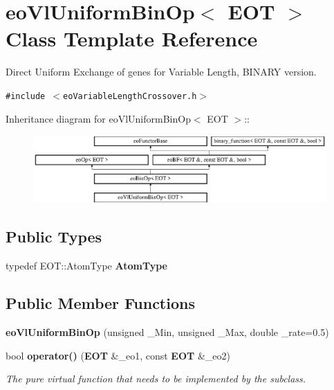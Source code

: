 \section{eo\-Vl\-Uniform\-Bin\-Op$<$ EOT $>$ Class Template Reference}
\label{classeo_vl_uniform_bin_op}
Direct Uniform Exchange of genes for Variable Length, BINARY version.  


{\tt \#include $<$eo\-Variable\-Length\-Crossover.h$>$}

Inheritance diagram for eo\-Vl\-Uniform\-Bin\-Op$<$ EOT $>$::\begin{figure}[H]
\begin{center}
\leavevmode
\includegraphics[height=2.60163cm]{classeo_vl_uniform_bin_op}
\end{center}
\end{figure}
\subsection*{Public Types}
\begin{CompactItemize}
\item 
typedef EOT::Atom\-Type {\bf Atom\-Type}\label{classeo_vl_uniform_bin_op_w0}

\end{CompactItemize}
\subsection*{Public Member Functions}
\begin{CompactItemize}
\item 
{\bf eo\-Vl\-Uniform\-Bin\-Op} (unsigned \_\-Min, unsigned \_\-Max, double \_\-rate=0.5)\label{classeo_vl_uniform_bin_op_a0}

\item 
bool {\bf operator()} ({\bf EOT} \&\_\-eo1, const {\bf EOT} \&\_\-eo2)\label{classeo_vl_uniform_bin_op_a1}

\begin{CompactList}\small\item\em The pure virtual function that needs to be implemented by the subclass. \item\end{CompactList}\end{CompactItemize}
